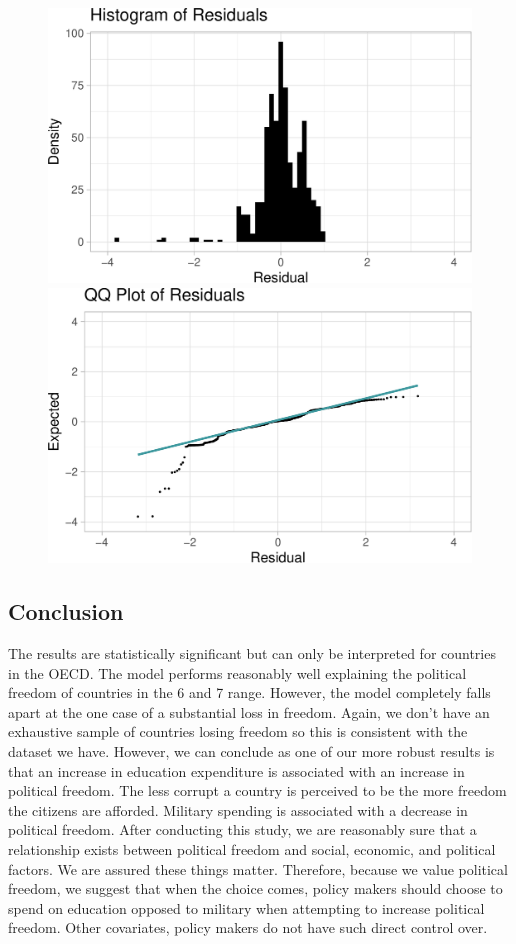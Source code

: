 \documentclass[
  english,
  man,floatsintext]{apa6}
\begin{document}
\begin{figure}
\includegraphics[width=0.5\linewidth]{paper_files/figure-latex/unnamed-chunk-6-1} \includegraphics[width=0.5\linewidth]{paper_files/figure-latex/unnamed-chunk-6-2} \caption{ }\label{fig:unnamed-chunk-6}
\end{figure}

\hypertarget{conclusion}{%
\subsection{Conclusion}\label{conclusion}}

The results are statistically significant but can only be interpreted for countries in the OECD. The model performs reasonably well explaining the political freedom of countries in the 6 and 7 range. However, the model completely falls apart at the one case of a substantial loss in freedom. Again, we don't have an exhaustive sample of countries losing freedom so this is consistent with the dataset we have. However, we can conclude as one of our more robust results is that an increase in education expenditure is associated with an increase in political freedom. The less corrupt a country is perceived to be the more freedom the citizens are afforded. Military spending is associated with a decrease in political freedom.
After conducting this study, we are reasonably sure that a relationship exists between political freedom and social, economic, and political factors. We are assured these things matter. Therefore, because we value political freedom, we suggest that when the choice comes, policy makers should choose to spend on education opposed to military when attempting to increase political freedom. Other covariates, policy makers do not have such direct control over.
\end{document}
